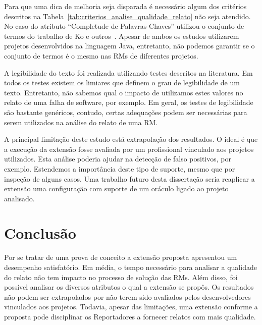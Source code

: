 Para que uma dica de melhoria seja disparada é necessário algum dos critérios
descritos na Tabela~\ref{tab:criterios_analise_qualidade_relato} não seja
atendido. No caso do atributo ``Completude de Palavras-Chaves'' utilizou o
conjunto de termos do trabalho de Ko e outros~\cite{ko2006linguistic}. Apesar de
ambos os estudos utilizarem projetos desenvolvidos na linguagem Java, entretanto,
não podemos garantir se o conjunto de termos é o mesmo nas RMs de diferentes
projetos.

A legibilidade do texto foi realizada utilizando testes descritos na literatura.
Em todos os testes existem os limiares que definem o grau de legibilidade de um
texto. Entretanto, não sabemos qual o impacto de utilizamos estes valores no
relato de uma falha de software, por exemplo. Em geral, os testes de
legibilidade são bastante genéricos, contudo, certas adequações podem ser
necessárias para serem utilizados na análise do relato de uma RM\@.

A principal limitação deste estudo está extrapolação dos resultados. O ideal é
que a execução da extensão fosse avaliada por um profissional vinculado aos
projetos utilizados. Esta análise poderia ajudar na detecção de falso
positivos, por exemplo. Estendemos a importância deste tipo de suporte, mesmo
que por inspeção de alguns casos. Uma trabalho futuro desta dissertação seria
reaplicar a extensão uma configuração com suporte de um oráculo ligado ao
projeto analisado.

\section{Conclusão}
\label{sec:implementacao_extensao_conclusao}

Por se tratar de uma prova de conceito a extensão proposta apresentou um
desempenho satisfatório. Em média, o tempo necessário para analisar a qualidade
do relato não tem impacto no processo de solução das RMs. Além disso, foi
possível analisar os diversos atributos o qual a extensão se propôs. Os
resultados não podem ser extrapolados por não terem sido avaliados pelos
desenvolvedores vinculados aos projetos. Todavia, apesar das limitações, uma
extensão conforme a proposta pode disciplinar os Reportadores a fornecer
relatos com mais qualidade.

